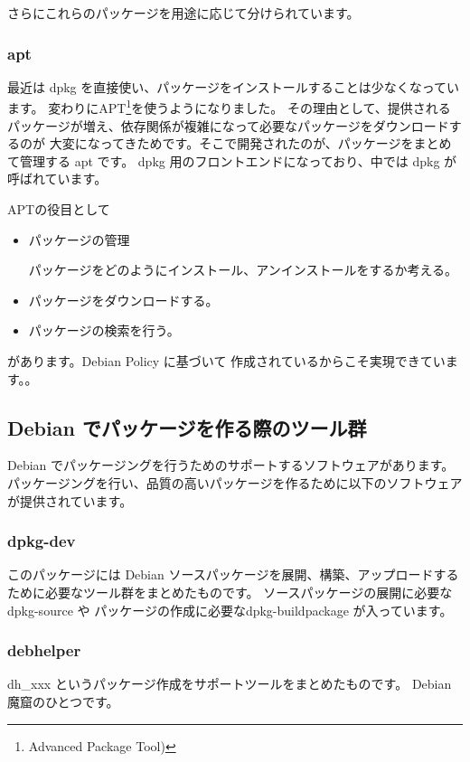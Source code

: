 \documentclass[mingoth,a4paper]{jsarticle}
\begin{document}
	 さらにこれらのパッケージを用途に応じて分けられています。

	
\subsubsection{apt}

	最近は dpkg を直接使い、パッケージをインストールすることは少なくなっています。
	変わりにAPT\footnote{Advanced Package Tool)}を使うようになりました。 
	その理由として、提供されるパッケージが増え、依存関係が複雑になって必要なパッケージをダウンロードするのが
	大変になってきためです。そこで開発されたのが、パッケージをまとめて管理する apt です。
	dpkg 用のフロントエンドになっており、中では dpkg が呼ばれています。
	
	APTの役目として
	\begin{itemize}
		\item パッケージの管理

			パッケージをどのようにインストール、アンインストールをするか考える。
		\item パッケージをダウンロードする。
		\item パッケージの検索を行う。
	\end{itemize}

	があります。Debian Policy に基づいて 作成されているからこそ実現できています。。

\subsection{Debian でパッケージを作る際のツール群}

	Debian でパッケージングを行うためのサポートするソフトウェアがあります。
	パッケージングを行い、品質の高いパッケージを作るために以下のソフトウェア
	が提供されています。

\subsubsection{dpkg-dev}
	このパッケージには Debian ソースパッケージを展開、構築、アップロードするために必要なツール群をまとめたものです。
	ソースパッケージの展開に必要な dpkg-source や パッケージの作成に必要なdpkg-buildpackage が入っています。
  
\subsubsection{debhelper}

	dh\_xxx というパッケージ作成をサポートツールをまとめたものです。
	Debian 魔窟のひとつです。
\end{document}
